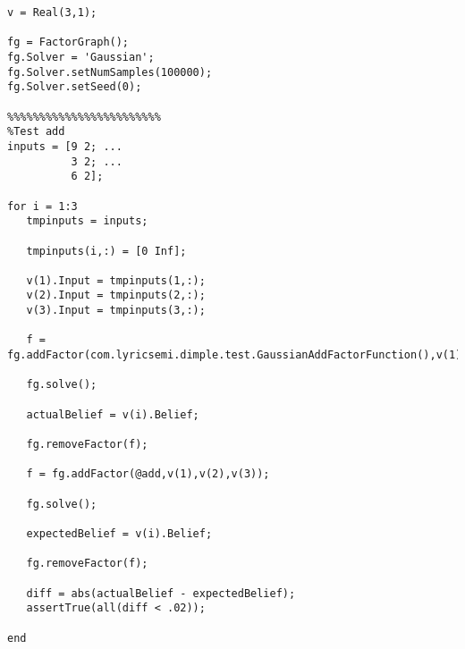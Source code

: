 \ifmatlab
\begin{lstlisting}
v = Real(3,1);

fg = FactorGraph();
fg.Solver = 'Gaussian';
fg.Solver.setNumSamples(100000);
fg.Solver.setSeed(0);

%%%%%%%%%%%%%%%%%%%%%%%%
%Test add
inputs = [9 2; ...
          3 2; ...
          6 2];

for i = 1:3
   tmpinputs = inputs;
    
   tmpinputs(i,:) = [0 Inf];
   
   v(1).Input = tmpinputs(1,:);
   v(2).Input = tmpinputs(2,:);
   v(3).Input = tmpinputs(3,:);

   f = fg.addFactor(com.lyricsemi.dimple.test.GaussianAddFactorFunction(),v(1),v(2),v(3));

   fg.solve();

   actualBelief = v(i).Belief;
    
   fg.removeFactor(f);
    
   f = fg.addFactor(@add,v(1),v(2),v(3));

   fg.solve();

   expectedBelief = v(i).Belief;
    
   fg.removeFactor(f);
    
   diff = abs(actualBelief - expectedBelief);
   assertTrue(all(diff < .02));

end
\end{lstlisting}
\fi

